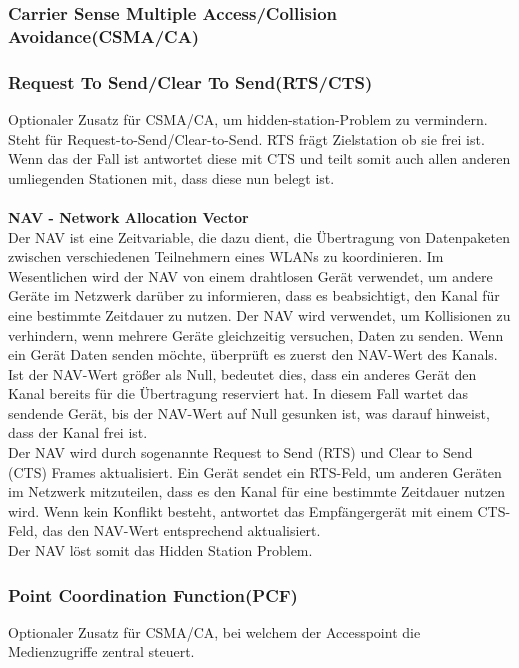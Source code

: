 \documentclass[12pt,a4paper]{article}
\begin{document}
		\subsubsection*{Carrier Sense Multiple Access/Collision Avoidance(CSMA/CA)}

		\subsubsection*{Request To Send/Clear To Send(RTS/CTS)}
			Optionaler Zusatz für CSMA/CA, um hidden-station-Problem zu vermindern. Steht für Request-to-Send/Clear-to-Send. RTS frägt Zielstation ob sie frei ist. Wenn das der Fall ist antwortet diese mit CTS und teilt somit auch allen anderen umliegenden Stationen mit, dass diese nun belegt ist.\\\\
			\textbf{NAV - Network Allocation Vector}\\
			Der NAV ist eine Zeitvariable, die dazu dient, die Übertragung von Datenpaketen zwischen verschiedenen Teilnehmern eines WLANs zu koordinieren. Im Wesentlichen wird der NAV von einem drahtlosen Gerät verwendet, um andere Geräte im Netzwerk darüber zu informieren, dass es beabsichtigt, den Kanal für eine bestimmte Zeitdauer zu nutzen. Der NAV wird verwendet, um Kollisionen zu verhindern, wenn mehrere Geräte gleichzeitig versuchen, Daten zu senden. Wenn ein Gerät Daten senden möchte, überprüft es zuerst den NAV-Wert des Kanals. Ist der NAV-Wert größer als Null, bedeutet dies, dass ein anderes Gerät den Kanal bereits für die Übertragung reserviert hat. In diesem Fall wartet das sendende Gerät, bis der NAV-Wert auf Null gesunken ist, was darauf hinweist, dass der Kanal frei ist.\\
			Der NAV wird durch sogenannte Request to Send (RTS) und Clear to Send (CTS) Frames aktualisiert. Ein Gerät sendet ein RTS-Feld, um anderen Geräten im Netzwerk mitzuteilen, dass es den Kanal für eine bestimmte Zeitdauer nutzen wird. Wenn kein Konflikt besteht, antwortet das Empfängergerät mit einem CTS-Feld, das den NAV-Wert entsprechend aktualisiert.\\
			Der NAV löst somit das Hidden Station Problem.
		
		\subsubsection*{Point Coordination Function(PCF)}
			Optionaler Zusatz für CSMA/CA, bei welchem der Accesspoint die Medienzugriffe zentral steuert.
\end{document}
